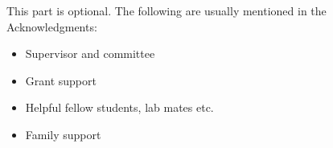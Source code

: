 
This part is optional. The following are usually mentioned in the
Acknowledgments:
\begin{itemize}
  \item Supervisor and committee
  \item Grant support
  \item Helpful fellow students, lab mates etc.
  \item Family support  
\end{itemize}
